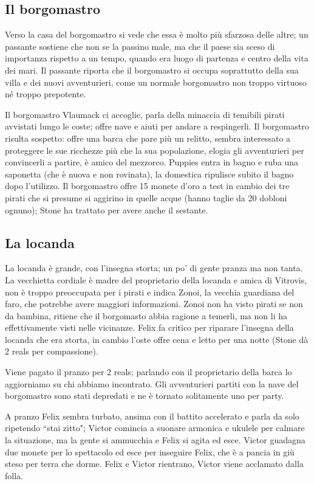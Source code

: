 \documentclass[letterpaper,twocolumn,openany,justified, nodeprecatedcode, nomultitoc]{dndbook}
\begin{document}
\subsection{Il borgomastro}
Verso la casa del borgomastro si vede che essa è molto più sfarzosa delle altre; un passante sostiene che non se la passino male, ma che il paese sia sceso di importanza rispetto a un tempo, quando era luogo di partenza e centro della vita dei mari. Il passante riporta che il borgomastro si occupa soprattutto della sua villa e dei nuovi avventurieri, come un normale borgomastro non troppo virtuoso né troppo prepotente.

Il borgomastro Vlaumack ci accoglie, parla della minaccia di temibili pirati avvistati lungo le coste; offre nave e aiuti per andare a respingerli. Il borgomastro risulta sospetto: offre una barca che pare più un relitto, sembra interessato a proteggere le sue ricchezze più che la sua popolazione, elogia gli avventurieri per convincerli a partire, è amico del mezzorco.
Puppies entra in bagno e ruba una saponetta (che è nuova e non rovinata), la domestica ripulisce subito il bagno dopo l'utilizzo.
Il borgomastro offre 15 monete d'oro a test in cambio dei tre pirati che si presume si aggirino in quelle acque (hanno taglie da 20 dobloni ognuno); Stone ha trattato per avere anche il sestante.

\subsection{La locanda}
La locanda è grande, con l'insegna storta; un po' di gente pranza ma non tanta. La vecchietta cordiale è madre del proprietario della locanda e amica di Vitrovis, non è troppo preoccupata per i pirati e indica Zonoi, la vecchia guardiana del faro, che potrebbe avere maggiori informazioni. Zonoi non ha visto pirati se non da bambina, ritiene che il borgomasto abbia ragione a temerli, ma non li ha effettivamente visti nelle vicinanze. Felix fa critico per riparare l'insegna della locanda che era storta, in cambio l'oste offre cena e letto per una notte (Stone dà 2 reals per compassione).

Viene pagato il pranzo per 2 reals; parlando con il proprietario della barca lo aggiorniamo su chi abbiamo incontrato. Gli avventurieri partiti con la nave del borgomastro sono stati depredati e ne è tornato solitamente uno per party.

A pranzo Felix sembra turbato, ansima con il battito accelerato e parla da solo ripetendo ``stai zitto"; Victor comincia a suonare armonica e ukulele per calmare la situazione, ma la gente si ammucchia e Felix si agita ed esce. Victor guadagna due monete per lo spettacolo ed esce per inseguire Felix, che è a pancia in giù steso per terra che dorme. Felix e Victor rientrano, Victor viene acclamato dalla folla.
\end{document}
